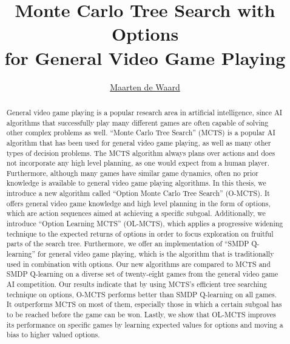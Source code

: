 \documentclass[a4]{report}
\title{Monte Carlo Tree Search with Options\\for General Video Game Playing}
\author{\href{mailto:mrtndwrd@gmail.com}{Maarten de Waard}}
\begin{document}

\maketitle

\begin{abstract}
	General video game playing is a popular research area in artificial
	intelligence, since AI algorithms that successfully play many different
	games are often capable of solving other complex problems as well.  ``Monte
	Carlo Tree Search'' (MCTS) is a popular AI algorithm that has been used for
	general video game playing, as well as many other types of decision
	problems.  The MCTS algorithm always plans over actions and does not
	incorporate any high level planning, as one would expect from a human
	player. Furthermore, although many games have similar game dynamics, often
	no prior knowledge is available to general video game playing algorithms.
	In this thesis, we introduce a new algorithm called ``Option Monte Carlo
	Tree Search'' (O-MCTS). It offers general video game knowledge and high
	level planning in the form of options, which are action sequences aimed at
	achieving a specific subgoal. Additionally, we introduce ``Option Learning
	MCTS'' (OL-MCTS), which applies a progressive widening technique to the
	expected returns of options in order to focus exploration on fruitful parts
	of the search tree. Furthermore, we offer an implementation of ``SMDP
	Q-learning'' for general video game playing, which is the algorithm
	that is traditionally used in combination with options. Our new algorithms
	are compared to MCTS and SMDP Q-learning on a diverse set of twenty-eight
	games from the general video game AI competition. Our results indicate that
	by using MCTS's efficient tree searching technique on options, O-MCTS
	performs better than SMDP Q-learning on all games. It outperforms MCTS on
	most of them, especially those in which a certain subgoal has to be reached
	before the game can be won.  Lastly, we show that OL-MCTS improves its
performance on specific games by learning expected values for options and moving
a bias to higher valued options.  \end{abstract}

\tableofcontents






\end{document}
